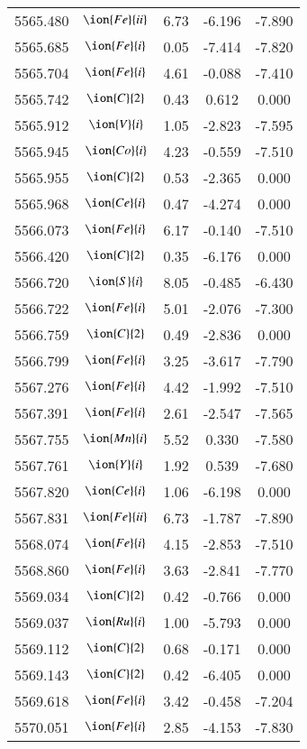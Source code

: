 \documentclass[fleqn,usenatbib]{mnras}
\begin{document}
\begin{center}
\begin{table}
\begin{tabular}{ccccc}
5565.480 &  $\ion{Fe}{ii}$  & 6.73 & -6.196 & -7.890 \\ 
5565.685 &  $\ion{Fe}{i}$  & 0.05 & -7.414 & -7.820 \\ 
5565.704 &  $\ion{Fe}{i}$  & 4.61 & -0.088 & -7.410 \\ 
5565.742 &  $\ion{C}{2}$ & 0.43 & 0.612 & 0.000 \\ 
5565.912 &  $\ion{V}{i}$  & 1.05 & -2.823 & -7.595 \\ 
5565.945 &  $\ion{Co}{i}$  & 4.23 & -0.559 & -7.510 \\ 
5565.955 &  $\ion{C}{2}$ & 0.53 & -2.365 & 0.000 \\ 
5565.968 &  $\ion{Ce}{i}$  & 0.47 & -4.274 & 0.000 \\ 
5566.073 &  $\ion{Fe}{i}$  & 6.17 & -0.140 & -7.510 \\ 
5566.420 &  $\ion{C}{2}$ & 0.35 & -6.176 & 0.000 \\ 
5566.720 &  $\ion{S}{i}$  & 8.05 & -0.485 & -6.430 \\ 
5566.722 &  $\ion{Fe}{i}$  & 5.01 & -2.076 & -7.300 \\ 
5566.759 &  $\ion{C}{2}$ & 0.49 & -2.836 & 0.000 \\ 
5566.799 &  $\ion{Fe}{i}$  & 3.25 & -3.617 & -7.790 \\ 
5567.276 &  $\ion{Fe}{i}$  & 4.42 & -1.992 & -7.510 \\ 
5567.391 &  $\ion{Fe}{i}$  & 2.61 & -2.547 & -7.565 \\ 
5567.755 &  $\ion{Mn}{i}$  & 5.52 & 0.330 & -7.580 \\ 
5567.761 &  $\ion{Y}{i}$  & 1.92 & 0.539 & -7.680 \\ 
5567.820 &  $\ion{Ce}{i}$  & 1.06 & -6.198 & 0.000 \\ 
5567.831 &  $\ion{Fe}{ii}$  & 6.73 & -1.787 & -7.890 \\ 
5568.074 &  $\ion{Fe}{i}$  & 4.15 & -2.853 & -7.510 \\ 
5568.860 &  $\ion{Fe}{i}$  & 3.63 & -2.841 & -7.770 \\ 
5569.034 &  $\ion{C}{2}$ & 0.42 & -0.766 & 0.000 \\ 
5569.037 &  $\ion{Ru}{i}$  & 1.00 & -5.793 & 0.000 \\ 
5569.112 &  $\ion{C}{2}$ & 0.68 & -0.171 & 0.000 \\ 
5569.143 &  $\ion{C}{2}$ & 0.42 & -6.405 & 0.000 \\ 
5569.618 &  $\ion{Fe}{i}$  & 3.42 & -0.458 & -7.204 \\ 
5570.051 &  $\ion{Fe}{i}$  & 2.85 & -4.153 & -7.830 \\ 

\end{tabular}
\end{table}
\end{center}
\end{document}
